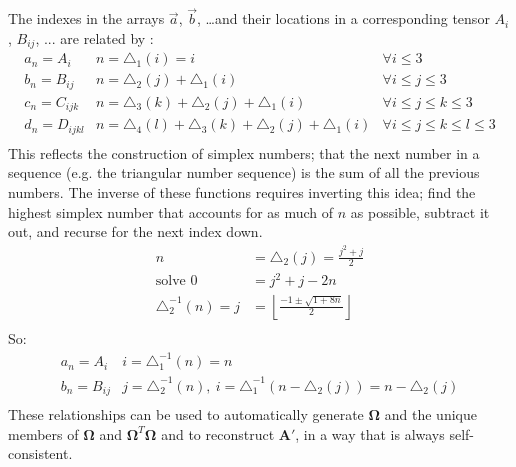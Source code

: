 \documentclass{article}
\def\mat#1{\mathbf{#1}}
\begin{document}
The indexes in the arrays $\vec{a}$, $\vec{b}$, \dots and their locations in a corresponding tensor $A_{i}$, $B_{ij}$, ... are related by :
\begin{equation}
\begin{array}{lll}
a_n = A_i      & n=\triangle_1(i) = i &  \forall i\leq 3 \\
b_n = B_{ij}   & n=\triangle_2(j)+\triangle_1(i) & \forall i\leq j \leq 3 \\
c_n = C_{ijk}  & n=\triangle_3(k)+\triangle_2(j)+\triangle_1(i) & \forall i\leq j \leq k\leq 3 \\
d_n = D_{ijkl} & n=\triangle_4(l)+\triangle_3(k)+\triangle_2(j)+\triangle_1(i) & \forall i\leq j \leq k\leq l \leq 3 \\
\end{array}
\end{equation}
This reflects the construction of simplex numbers; that the next number in a sequence (e.g. the triangular number sequence)
is the sum of all the previous numbers. The inverse of these functions requires inverting this idea; find the highest simplex number that
accounts for as much of $n$ as possible, subtract it out, and recurse for the next index down.
\begin{equation}
\begin{split}
n &= \triangle_2(j) = \frac{j^2 + j}{2} \\
\text{solve } 0 &= j^2 + j - 2n \\
\triangle_2^{-1}(n) = j &= \left\lfloor \frac{-1 \pm \sqrt{1 + 8n}}{2} \right\rfloor \\
\end{split}
\end{equation}
So:
\begin{equation}
\begin{array}{ll}
a_n = A_i      & i=\triangle_1^{-1}(n) = n \\
b_n = B_{ij}   & j=\triangle_2^{-1}(n),~ i = \triangle_1^{-1}(n-\triangle_2(j)) = n-\triangle_2(j) \\
\end{array}
\end{equation}
These relationships can be used to automatically generate $\mat{\Omega}$ and the 
unique members of $\mat{\Omega}$ and $\mat{\Omega}^{T}\mat{\Omega}$ and to 
reconstruct $\mat{A'}$, in a way that is always self-consistent.
\end{document}
